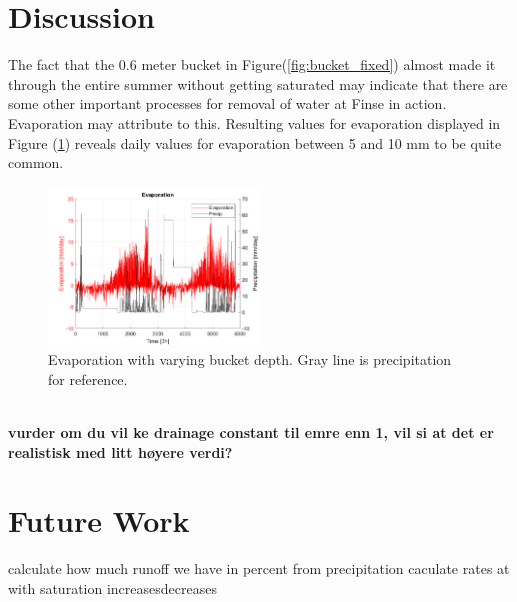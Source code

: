 \documentclass[a4paper,11pt,twocolumn]{article}
\begin{document}
\section{Discussion}
The fact that the 0.6 meter bucket in  Figure(\ref{fig:bucket_fixed}) almost made it through the entire summer without getting saturated may indicate that there are some other important processes for removal of water at Finse in action. Evaporation may attribute to this. Resulting values for evaporation displayed in Figure (\ref{fig:evaporation}) reveals daily values for evaporation between 5 and 10 mm to be quite common.    
\begin{figure}[h]
	\centering 
	\includegraphics[width=0.5\textwidth]{figures/evaporation}
	\caption{Evaporation with varying bucket depth. Gray line is precipitation for reference.}
	\label{fig:evaporation}
\end{figure} 
\\
\textbf{vurder om du vil ke drainage constant til emre enn 1, vil si at det er realistisk med litt høyere verdi?}
\section{Future Work}
calculate how much runoff we have in percent from precipitation
caculate rates at with saturation increasesdecreases
\end{document}
